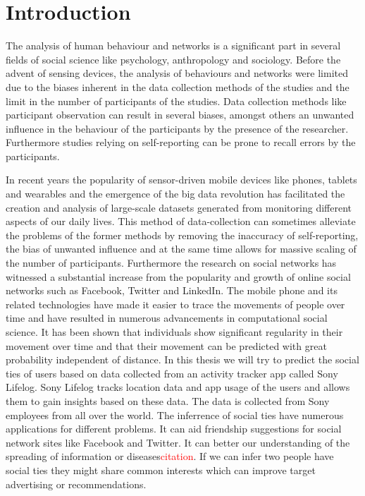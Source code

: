 \chapter{Introduction}
The analysis of human behaviour and networks is a significant part in several fields of social science like psychology, anthropology and sociology. Before the advent of sensing devices, the analysis of behaviours and networks were limited due to the biases inherent in the data collection methods of the studies and the limit in the number of participants of the studies. Data collection methods like participant observation can result in several biases, amongst others an unwanted influence in the behaviour of the participants by the presence of the researcher\cite{rosenthal1966experimenter}. Furthermore studies relying on self-reporting can be prone to recall errors by the participants\cite{stone1999science}.

In recent years the popularity of sensor-driven mobile devices like phones, tablets and wearables and the emergence of the big data revolution has facilitated the creation and analysis of large-scale datasets generated from monitoring different aspects of our daily lives\cite{lazer2009life}. This method of data-collection can sometimes alleviate the problems of the former methods by removing the inaccuracy of self-reporting, the bias of unwanted influence and at the same time allows for massive scaling of the number of participants. Furthermore the research on social networks has witnessed a substantial increase from the popularity and growth of online social networks such as Facebook, Twitter and LinkedIn\cite{social_networks}. The mobile phone and its related technologies have made it easier to trace the movements of people over time and have resulted in numerous advancements in computational social science. It has been shown that individuals show significant regularity in their movement over time\cite{Uihmp} and that their movement can be predicted with great probability independent of distance\cite{LoPiHM}. In this thesis we will try to predict the social ties of users based on data collected from an activity tracker app called Sony Lifelog\cite{sonyLifeLog}. Sony Lifelog tracks location data and app usage of the users and allows them to gain insights based on these data. The data is collected from Sony employees from all over the world.
The inferrence of social ties have numerous applications for different problems. It can aid friendship suggestions for social network sites like Facebook and Twitter. It can better our understanding of the spreading of information or diseases\textcolor{red}{citation}. If we can infer two people have social ties they might share common interests which can improve target advertising or recommendations.

